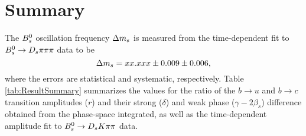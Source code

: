 \section{Summary}
\label{sec:Summary}


The ${{B}^0_{s}}$ oscillation frequency ${\Delta m_{{s}}}$ is measured from the time-dependent fit to ${{B}^0_{s}}\rightarrow{\ensuremath{{D}_{s}}}{\ensuremath{\pi}}{\ensuremath{\pi}}{\ensuremath{\pi}}$ data to be
\begin{equation*}
{\ensuremath{\Delta m_{{s}}}} = xx.xxx \pm 0.009 \pm 0.006,  
\end{equation*}
where the errors are statistical and systematic, respectively.
Table \ref{tab:ResultSummary} summarizes the values for the ratio of the $b\to u$ and $b\to c$ transition amplitudes ($r$)
and their strong ($\delta$) and weak phase ($\gamma -2 \beta_s$) difference 
obtained from the phase-space integrated, as well as the time-dependent amplitude fit to ${{B}^0_{s}}\rightarrow{\ensuremath{{D}_{s}}}{\ensuremath{K}}{\ensuremath{\pi}}{\ensuremath{\pi}}$ data.
\\

